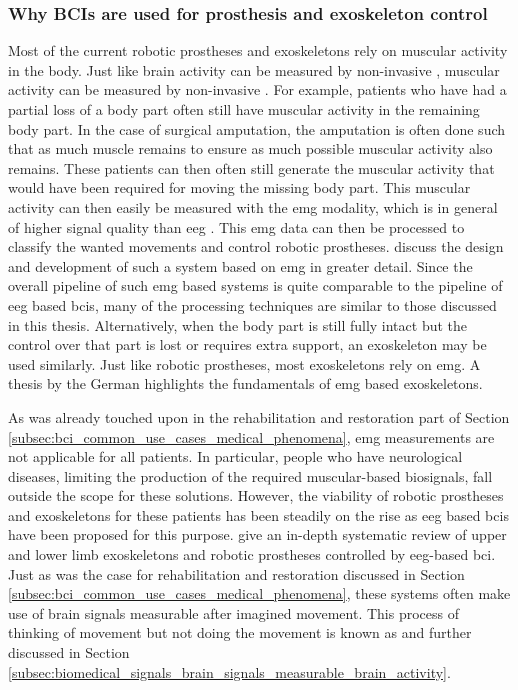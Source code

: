 
\subsubsection{Why BCIs are used for prosthesis and exoskeleton control}
\label{subsubsec:bci_common_use_cases_prosthesis_exoskeleton_why}

Most of the current robotic prostheses and exoskeletons rely on muscular activity in the body.
Just like brain activity can be measured by non-invasive , muscular activity can be measured by non-invasive .
For example, patients who have had a partial loss of a body part often still have muscular activity in the remaining body part.
In the case of surgical amputation, the amputation is often done such that as much muscle remains to ensure as much possible muscular activity also remains.
These patients can then often still generate the muscular activity that would have been required for moving the missing body part.
This muscular activity can then easily be measured with the \gls{emg} modality, which is in general of higher signal quality than \gls{eeg} \citep{hybrid_eeg_emg_prosthesis}.
This \gls{emg} data can then be processed to classify the wanted movements and control robotic prostheses.
 discuss the design and development of such a system based on \gls{emg} in greater detail.
Since the overall pipeline of such \gls{emg} based systems is quite comparable to the pipeline of \gls{eeg} based \glspl{bci}, many of the processing techniques are similar to those discussed in this thesis.
Alternatively, when the body part is still fully intact but the control over that part is lost or requires extra support, an exoskeleton may be used similarly.
Just like robotic prostheses, most exoskeletons rely on \gls{emg}.
A thesis by the German \citet{emg_exoskeleton} highlights the fundamentals of \gls{emg} based exoskeletons.

As was already touched upon in the rehabilitation and restoration part of Section \ref{subsec:bci_common_use_cases_medical_phenomena}, \gls{emg} measurements are not applicable for all patients.
In particular, people who have neurological diseases, limiting the production of the required muscular-based \glspl{biosignal}, fall outside the scope for these solutions.
However, the viability of robotic prostheses and exoskeletons for these patients has been steadily on the rise as \gls{eeg} based \glspl{bci} have been proposed for this purpose.
 give an in-depth systematic review of upper and lower limb exoskeletons and robotic prostheses controlled by \gls{eeg}-based \gls{bci}.
Just as was the case for rehabilitation and restoration discussed in Section \ref{subsec:bci_common_use_cases_medical_phenomena}, these systems often make use of brain signals measurable after imagined movement.
This process of thinking of movement but not doing the movement is known as  and further discussed in Section \ref{subsec:biomedical_signals_brain_signals_measurable_brain_activity}.


